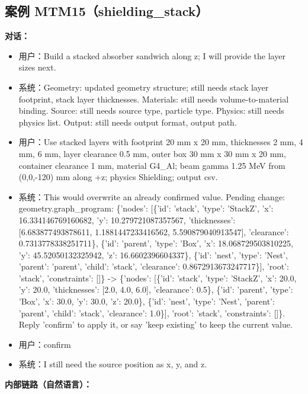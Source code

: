 \documentclass[11pt]{ctexart}
\begin{document}
\subsection{案例 MTM15（shielding\_stack）}
\textbf{对话：}
\begin{itemize}
\item 用户：Build a stacked absorber sandwich along z; I will provide the layer sizes next.
\item 系统：Geometry: updated geometry structure; still needs stack layer footprint, stack layer thicknesses. Materials: still needs volume-to-material binding. Source: still needs source type, particle type. Physics: still needs physics list. Output: still needs output format, output path.
\item 用户：Use stacked layers with footprint 20 mm x 20 mm, thicknesses 2 mm, 4 mm, 6 mm, layer clearance 0.5 mm, outer box 30 mm x 30 mm x 20 mm, container clearance 1 mm, material G4\_Al; beam gamma 1.25 MeV from (0,0,-120) mm along +z; physics Shielding; output csv.
\item 系统：This would overwrite an already confirmed value. Pending change: geometry.graph\_program: \{'nodes': [\{'id': 'stack', 'type': 'StackZ', 'x': 16.334146769160682, 'y': 10.279721087357567, 'thicknesses': [6.683877493878611, 1.1881447233416562, 5.590879040913547], 'clearance': 0.7313778338251711\}, \{'id': 'parent', 'type': 'Box', 'x': 18.068729503810225, 'y': 45.52050132325942, 'z': 16.6602396604337\}, \{'id': 'nest', 'type': 'Nest', 'parent': 'parent', 'child': 'stack', 'clearance': 0.8672913673247717\}], 'root': 'stack', 'constraints': []\} -> \{'nodes': [\{'id': 'stack', 'type': 'StackZ', 'x': 20.0, 'y': 20.0, 'thicknesses': [2.0, 4.0, 6.0], 'clearance': 0.5\}, \{'id': 'parent', 'type': 'Box', 'x': 30.0, 'y': 30.0, 'z': 20.0\}, \{'id': 'nest', 'type': 'Nest', 'parent': 'parent', 'child': 'stack', 'clearance': 1.0\}], 'root': 'stack', 'constraints': []\}. Reply 'confirm' to apply it, or say 'keep existing' to keep the current value.
\item 用户：confirm
\item 系统：I still need the source position as x, y, and z.
\end{itemize}
\textbf{内部链路（自然语言）：}
\end{document}
